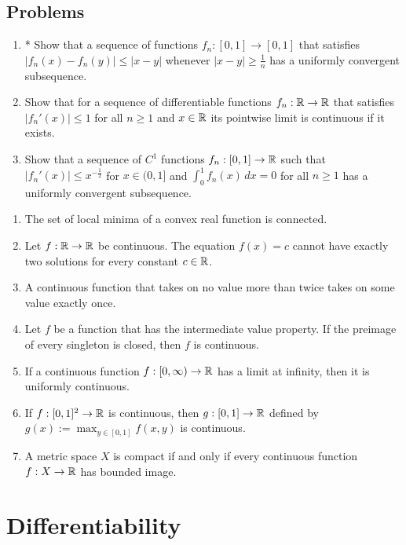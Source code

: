 \documentclass{../../large}
\begin{document}
\section*{Problems}
\begin{enumerate}
\item* Show that a sequence of functions $f_n:[0,1]\to[0,1]$ that satisfies $|f_n(x)-f_n(y)|\le|x-y|$ whenever $|x-y|\ge\frac1n$ has a uniformly convergent subsequence.
\item Show that for a sequence of differentiable functions $f_n:\mathbb{R}\to\mathbb{R}$ that satisfies $|f_n'(x)|\le1$ for all $n\ge1$ and $x\in\mathbb{R}$ its pointwise limit is continuous if it exists.
\item Show that a sequence of $C^1$ functions $f_n:[0,1]\to\mathbb{R}$ such that $|f_n'(x)|\le x^{-\frac12}$ for $x\in(0,1]$ and $\int_0^1f_n(x)\,dx=0$ for all $n\ge1$ has a uniformly convergent subsequence.
\end{enumerate}


\begin{enumerate}
\item The set of local minima of a convex real function is connected.
\item Let $f:\mathbb{R}\to\mathbb{R}$ be continuous.
The equation $f(x)=c$ cannot have exactly two solutions for every constant $c\in\mathbb{R}$.
\item A continuous function that takes on no value more than twice takes on some value exactly once.
\item Let $f$ be a function that has the intermediate value property.
If the preimage of every singleton is closed, then $f$ is continuous.
\item If a continuous function $f:[0,\infty)\to\mathbb{R}$ has a limit at infinity, then it is uniformly continuous.
\item If $f:[0,1]^2\to\mathbb{R}$ is continuous, then $g:[0,1]\to\mathbb{R}$ defined by $g(x):=\max_{y\in[0,1]}f(x,y)$ is continuous.
\item A metric space $X$ is compact if and only if every continuous function $f:X\to\mathbb{R}$ has bounded image.
\end{enumerate}







\chapter{Differentiability}
\end{document}
